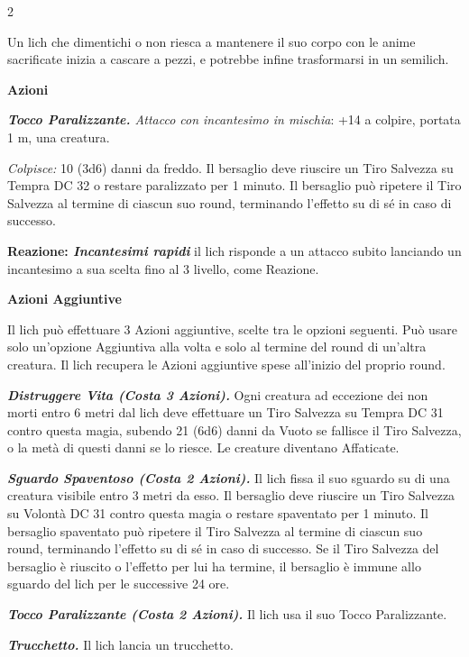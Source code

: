 \begin{multicols}{2}
{Un lich che dimentichi o non riesca a mantenere il suo corpo con le anime sacrificate inizia a cascare a pezzi, e potrebbe infine trasformarsi in un semilich.

\textbf{Azioni}

\emph{\textbf{Tocco Paralizzante.} Attacco con incantesimo in mischia}: +14 a colpire, portata 1 m, una creatura.

\emph{Colpisce:} 10 (3d6) danni da freddo. Il bersaglio deve riuscire un Tiro Salvezza su Tempra DC 32 o restare paralizzato per 1 minuto. Il bersaglio può ripetere il Tiro Salvezza al termine di ciascun suo round, terminando l'effetto su di sé in caso di successo.

\textbf{Reazione: \emph{Incantesimi rapidi}} il lich risponde a un attacco subito lanciando un incantesimo a sua scelta fino al 3 livello, come Reazione.

\textbf{Azioni Aggiuntive}

Il lich può effettuare 3 Azioni aggiuntive, scelte tra le opzioni seguenti. Può usare solo un'opzione Aggiuntiva alla volta e solo al termine del round di un'altra creatura. Il lich recupera le Azioni aggiuntive spese all'inizio del proprio round.

\emph{\textbf{Distruggere Vita (Costa 3 Azioni).}} Ogni creatura ad eccezione dei non morti entro 6 metri dal lich deve effettuare un Tiro Salvezza su Tempra DC 31 contro questa magia, subendo 21 (6d6) danni da Vuoto se fallisce il Tiro Salvezza, o la metà di questi danni se lo riesce. Le creature diventano Affaticate.

\emph{\textbf{Sguardo Spaventoso (Costa 2 Azioni).}} Il lich fissa il suo sguardo su di una creatura visibile entro 3 metri da esso. Il bersaglio deve riuscire un Tiro Salvezza su Volontà DC 31 contro questa magia o restare spaventato per 1 minuto. Il bersaglio spaventato può ripetere il Tiro Salvezza al termine di ciascun suo round, terminando l'effetto su di sé in caso di successo. Se il Tiro Salvezza del bersaglio è riuscito o l'effetto per lui ha termine, il bersaglio è immune allo sguardo del lich per le successive 24 ore.

\emph{\textbf{Tocco Paralizzante (Costa 2 Azioni).}} Il lich usa il suo Tocco Paralizzante.

\emph{\textbf{Trucchetto.}} Il lich lancia un trucchetto.

}
\end{multicols}
